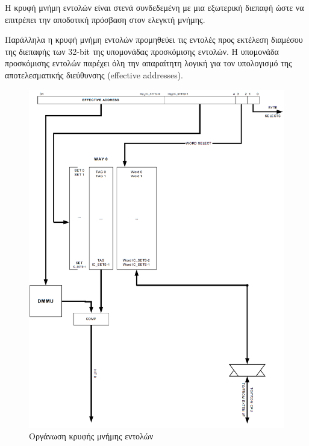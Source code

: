 \documentclass[a4paper,10pt]{article}
\numberwithin{figure}{section}
\numberwithin{table}{section}
\begin{document}
Η κρυφή μνήμη εντολών είναι στενά συνδεδεμένη με μια εξωτερική διεπαφή ώστε να επιτρέπει την αποδοτική
πρόσβαση στον ελεγκτή μνήμης.
\newline

Παράλληλα η κρυφή μνήμη εντολών προμηθεύει τις εντολές προς εκτέλεση διαμέσου
της διεπαφής των 32-bit της υπομονάδας προσκόμισης εντολών. Η υπομονάδα προσκόμισης εντολών
 παρέχει όλη την απαραίτητη λογική για
τον υπολογισμό της αποτελεσματικής διεύθυνσης (effective addresses).

\vspace{0.7cm}
\begin{figure}[h!]
 \centering
 \includegraphics[bb=0 0 908 1201,scale=0.38]{./Images/instruction_cache.png}
 \caption{Οργάνωση κρυφής μνήμης εντολών}
\end{figure}
\vspace{0.7cm}
\end{document}
